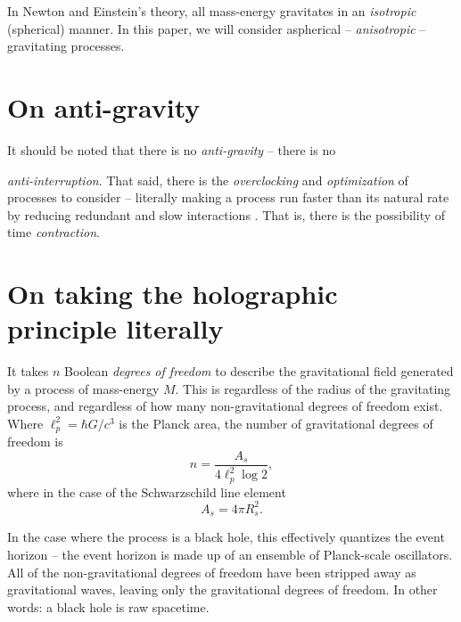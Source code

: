 \documentclass[12pt]{article}
\begin{document}
In Newton and Einstein's theory, all mass-energy gravitates in an {\textit{isotropic}} (spherical) manner.
In this paper, we will consider aspherical -- {\textit{anisotropic}} -- gravitating processes.







\section{On anti-gravity}

It should be noted that there is no {\textit{anti-gravity}} -- there is no {\textit{anti-interruption}.
That said, there is the {\textit{overclocking}} and {\textit{optimization}} of processes to consider -- literally making a process run faster than its natural rate by reducing redundant and slow interactions \cite{wainner, mcconnell, pikus}.
That is, there is the possibility of time {\textit{contraction}}.






\section{On taking the holographic principle literally}

It takes $n$ Boolean {\textit{degrees of freedom}} to describe the gravitational field \cite{hooft, susskind, bousso} generated by a process of mass-energy $M$.
This is regardless of the radius of the gravitating process, and regardless of how many non-gravitational degrees of freedom exist.
Where $\ell_p^2 = \hbar G / c^3$ is the Planck area, the number of gravitational degrees of freedom is
\begin{equation}
n = \frac{A_s}{4 \ell_p^2 \log 2},
\end{equation}
where in the case of the Schwarzschild line element
\begin{equation}
A_s = 4 \pi R_s^2.
\end{equation}

In the case where the process is a black hole, this effectively quantizes the event horizon -- the event horizon is made up of an ensemble of Planck-scale oscillators.
All of the non-gravitational degrees of freedom have been stripped away as gravitational waves, leaving only the gravitational degrees of freedom.
In other words: a black hole is raw spacetime.

}
\end{document}
